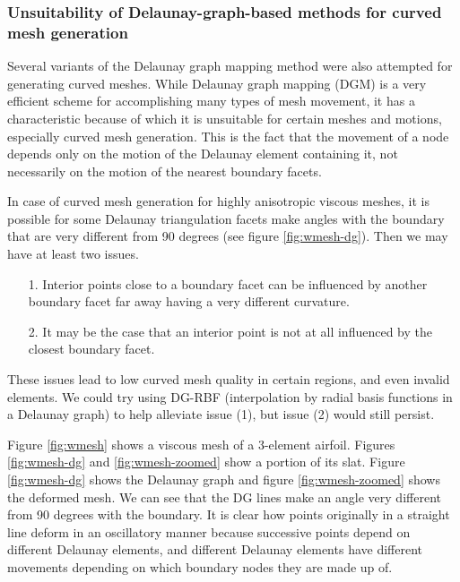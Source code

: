 \subsubsection{Unsuitability of Delaunay-graph-based methods for curved mesh generation}
\label{subsec:dgmunsuitable}

Several variants of the Delaunay graph mapping method were also attempted for generating curved meshes. While Delaunay graph mapping (DGM) is a very efficient scheme for accomplishing many types of mesh movement, it has a characteristic because of which it is unsuitable for certain meshes and motions, especially curved mesh generation. This is the fact that the movement of a node depends only on the motion of the Delaunay element containing it, not necessarily on the motion of the nearest boundary facets.

In case of curved mesh generation for highly anisotropic viscous meshes, it is possible for some Delaunay triangulation facets make angles with the boundary that are very different from 90 degrees (see figure \ref{fig:wmesh-dg}). Then we may have at least two issues.
\begin{itemize}
	\item[1.] Interior points close to a boundary facet can be influenced by another boundary facet far away having a very different curvature.
	\item[2.] It may be the case that an interior point is not at all influenced by the closest boundary facet.
\end{itemize}
These issues lead to low curved mesh quality in certain regions, and even invalid elements. We could try using DG-RBF (interpolation by radial basis functions in a Delaunay graph) to help alleviate issue (1), but issue (2) would still persist.

Figure \ref{fig:wmesh} shows a viscous mesh of a 3-element airfoil. Figures \ref{fig:wmesh-dg} and \ref{fig:wmesh-zoomed} show a portion of its slat. Figure \ref{fig:wmesh-dg} shows the Delaunay graph and figure \ref{fig:wmesh-zoomed} shows the deformed mesh. We can see that the DG lines make an angle very different from 90 degrees with the boundary. It is clear how points originally in a straight line deform in an oscillatory manner because successive points depend on different Delaunay elements, and different Delaunay elements have different movements depending on which boundary nodes they are made up of.

